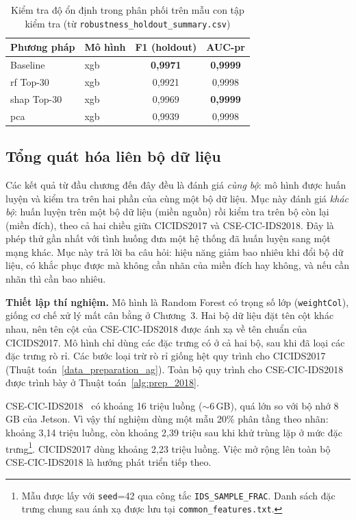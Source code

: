 \begin{table}[htbp]
\centering
\caption[Kiểm tra độ ổn định trong phân phối trên mẫu con tập kiểm tra]{Kiểm tra độ ổn định trong phân phối trên mẫu con tập kiểm tra (từ \texttt{robustness\_holdout\_summary.csv})}
\label{tab:robustness}
\begin{tabular*}{\textwidth}{@{\extracolsep{\fill}}llcc@{}}
\toprule
\textbf{Phương pháp} & \textbf{Mô hình} & \textbf{F1 (holdout)} & \textbf{AUC-\ac{pr}} \\ \midrule
Baseline & \ac{xgb} & \textbf{0{,}9971} & \textbf{0{,}9999} \\
\ac{rf} Top-30 & \ac{xgb} & 0{,}9921 & 0{,}9998 \\
\ac{shap} Top-30 & \ac{xgb} & 0{,}9969 & \textbf{0{,}9999} \\
\ac{pca} & \ac{xgb} & 0{,}9939 & 0{,}9998 \\ \bottomrule
\end{tabular*}
\end{table}

\subsection{Tổng quát hóa liên bộ dữ liệu}
\label{sec:cross-dataset}
Các kết quả từ đầu chương đến đây đều là đánh giá \emph{cùng bộ}: mô hình được huấn luyện và kiểm tra trên hai phần của cùng một bộ dữ liệu. Mục này đánh giá \emph{khác bộ}: huấn luyện trên một bộ dữ liệu (miền nguồn) rồi kiểm tra trên bộ còn lại (miền đích), theo cả hai chiều giữa CICIDS2017 và CSE-CIC-IDS2018. Đây là phép thử gần nhất với tình huống đưa một hệ thống đã huấn luyện sang một mạng khác. Mục này trả lời ba câu hỏi: hiệu năng giảm bao nhiêu khi đổi bộ dữ liệu, có khắc phục được mà không cần nhãn của miền đích hay không, và nếu cần nhãn thì cần bao nhiêu.

\textbf{Thiết lập thí nghiệm.} Mô hình là Random Forest có trọng số lớp (\texttt{weightCol}), giống cơ chế xử lý mất cân bằng ở Chương~3. Hai bộ dữ liệu đặt tên cột khác nhau, nên tên cột của CSE-CIC-IDS2018 được ánh xạ về tên chuẩn của CICIDS2017. Mô hình chỉ dùng các đặc trưng có ở cả hai bộ, sau khi đã loại các đặc trưng rò rỉ. Các bước loại trừ rò rỉ giống hệt quy trình cho CICIDS2017 (Thuật toán~\ref{data_preparation_ag}). Toàn bộ quy trình cho CSE-CIC-IDS2018 được trình bày ở Thuật toán~\ref{alg:prep_2018}.

CSE-CIC-IDS2018~\cite{csecicids2018} có khoảng 16 triệu luồng ($\sim$6\,GB), quá lớn so với bộ nhớ 8\,GB của Jetson. Vì vậy thí nghiệm dùng một mẫu 20\% phân tầng theo nhãn: khoảng 3{,}14 triệu luồng, còn khoảng 2{,}39 triệu sau khi khử trùng lặp ở mức đặc trưng\footnote{Mẫu được lấy với \texttt{seed}=42 qua công tắc \texttt{IDS\_SAMPLE\_FRAC}. Danh sách đặc trưng chung sau ánh xạ được lưu tại \texttt{common\_features.txt}.}. CICIDS2017 dùng khoảng 2{,}23 triệu luồng. Việc mở rộng lên toàn bộ CSE-CIC-IDS2018 là hướng phát triển tiếp theo.

